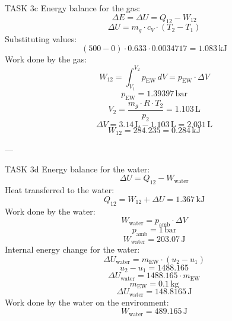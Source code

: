 TASK 3c  
Energy balance for the gas:  
\[
\Delta E = \Delta U = Q_{12} - W_{12}
\]  
\[
\Delta U = m_g \cdot c_V \cdot (T_2 - T_1)
\]  
Substituting values:  
\[
(500 - 0) \cdot 0.633 \cdot 0.0034717 = 1.083 \, \text{kJ}
\]  
Work done by the gas:  
\[
W_{12} = \int_{V_1}^{V_2} p_{\text{EW}} \, dV = p_{\text{EW}} \cdot \Delta V
\]  
\[
p_{\text{EW}} = 1.39397 \, \text{bar}
\]  
\[
V_2 = \frac{m_g \cdot R \cdot T_2}{p_2} = 1.103 \, \text{L}
\]  
\[
\Delta V = 3.14 \, \text{L} - 1.103 \, \text{L} = 2.031 \, \text{L}
\]  
\[
W_{12} = 284.235 = 0.284 \, \text{kJ}
\]  

---

TASK 3d  
Energy balance for the water:  
\[
\Delta U = Q_{12} - W_{\text{water}}
\]  
Heat transferred to the water:  
\[
Q_{12} = W_{12} + \Delta U = 1.367 \, \text{kJ}
\]  
Work done by the water:  
\[
W_{\text{water}} = p_{\text{amb}} \cdot \Delta V
\]  
\[
p_{\text{amb}} = 1 \, \text{bar}
\]  
\[
W_{\text{water}} = 203.07 \, \text{J}
\]  
Internal energy change for the water:  
\[
\Delta U_{\text{water}} = m_{\text{EW}} \cdot (u_2 - u_1)
\]  
\[
u_2 - u_1 = 1488.165
\]  
\[
\Delta U_{\text{water}} = 1488.165 \cdot m_{\text{EW}}
\]  
\[
m_{\text{EW}} = 0.1 \, \text{kg}
\]  
\[
\Delta U_{\text{water}} = 148.8165 \, \text{J}
\]  
Work done by the water on the environment:  
\[
W_{\text{water}} = 489.165 \, \text{J}
\]  
